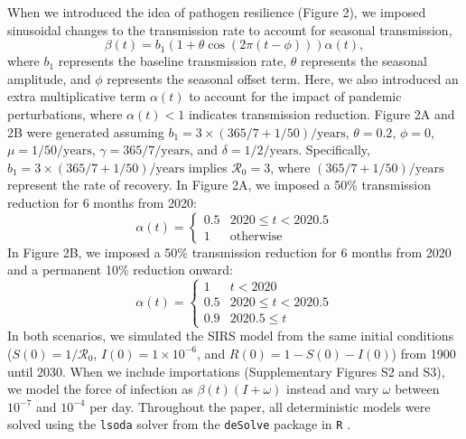 \documentclass[12pt]{article}
\begin{document}
When we introduced the idea of pathogen resilience (Figure 2), we imposed sinusoidal changes to the transmission rate to account for seasonal transmission,
\begin{equation}
\beta(t) = b_1 (1 + \theta \cos(2 \pi (t-\phi))) \alpha(t),
\end{equation}
where $b_1$ represents the baseline transmission rate, $\theta$ represents the seasonal amplitude, and $\phi$ represents the seasonal offset term.
Here, we also introduced an extra multiplicative term $\alpha(t)$ to account for the impact of pandemic perturbations, where $\alpha(t) < 1$ indicates transmission reduction.
Figure 2A and 2B were generated assuming $b_1 = 3 \times (365/7+1/50)/\mathrm{years}$, $\theta=0.2$, $\phi=0$, $\mu=1/50/\mathrm{years}$, $\gamma=365/7/\mathrm{years}$, and $\delta=1/2/\mathrm{years}$.
Specifically, $b_1 = 3 \times (365/7+1/50)/\mathrm{years}$ implies $\mathcal R_0 = 3$, where $(365/7+1/50)/\mathrm{years}$ represent the rate of recovery.
In Figure 2A, we imposed a 50\% transmission reduction for 6 months from 2020:
\begin{equation}
\alpha(t) = \begin{cases}
0.5 & 2020 \leq t< 2020.5\\
1 & \textrm{otherwise}
\end{cases}
\end{equation}
In Figure 2B, we imposed a 50\% transmission reduction for 6 months from 2020 and a permanent 10\% reduction onward:
\begin{equation}
\alpha(t) = \begin{cases}
1 & t < 2020\\
0.5 & 2020 \leq t < 2020.5\\
0.9 & 2020.5 \leq t
\end{cases}
\end{equation}
In both scenarios, we simulated the SIRS model from the same initial conditions ($S(0) = 1/\mathcal R_0$, $I(0) = 1\times 10^{-6}$, and $R(0) = 1 - S(0) - I(0)$) from 1900 until 2030.
When we include importations (Supplementary Figures S2 and S3), we model the force of infection as $\beta(t) (I + \omega)$ instead and vary $\omega$ between $10^{-7}$ and $10^{-4}$ per day.
Throughout the paper, all deterministic models were solved using the \texttt{lsoda} solver from the \texttt{deSolve} package \citep{soetaert2010solving} in \texttt{R} \citep{citeR}.
\end{document}

